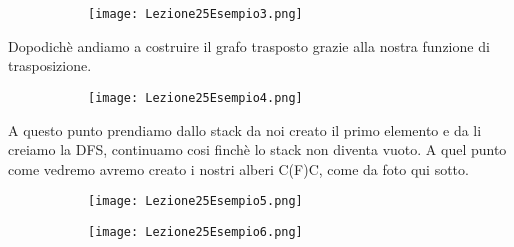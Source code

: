 \begin{figure}[H]
	\centering
	\begin{subfigure}[b]{0.20\textwidth}
		\texttt{[image: Lezione25Esempio3.png]} 
	\end{subfigure}
\end{figure}

Dopodichè andiamo a costruire il grafo trasposto grazie alla nostra funzione di trasposizione.

\begin{figure}[H]
	\centering
	\begin{subfigure}[b]{0.40\textwidth}
		\texttt{[image: Lezione25Esempio4.png]} 
	\end{subfigure}
\end{figure}

A questo punto prendiamo dallo stack da noi creato il primo elemento e da li creiamo la DFS, continuamo cosi finchè lo stack non diventa vuoto.
A quel punto come vedremo avremo creato i nostri alberi C(F)C, come da foto qui sotto.

\begin{figure}[H]
	\centering
	\begin{subfigure}[b]{0.30\textwidth}
		\texttt{[image: Lezione25Esempio5.png]} 
	\end{subfigure}
\end{figure}

\begin{figure}[H]
	\centering
	\begin{subfigure}[b]{0.25\textwidth}
		\texttt{[image: Lezione25Esempio6.png]} 
	\end{subfigure}
\end{figure}